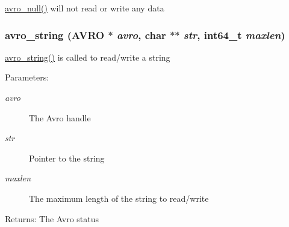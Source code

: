 \hyperlink{group___primitives_gad3a89fbddd4853036ed861dba1ee2c1}{avro\_\-null()} will not read or write any data \hypertarget{group___primitives_g4d568c22cdd854ea5a9c85ed622f7d91}{
\subsubsection[{avro\_\-string}]{ avro\_\-string ({\bf AVRO} $\ast$ {\em avro}, \/  char $\ast$$\ast$ {\em str}, \/  int64\_\-t {\em maxlen})}}
\label{group___primitives_g4d568c22cdd854ea5a9c85ed622f7d91}


\hyperlink{group___primitives_g4d568c22cdd854ea5a9c85ed622f7d91}{avro\_\-string()} is called to read/write a string \begin{Desc}
\item[Parameters:]
\begin{description}
\item[{\em avro}]The Avro handle \item[{\em str}]Pointer to the string \item[{\em maxlen}]The maximum length of the string to read/write \end{description}
\end{Desc}
\begin{Desc}
\item[Returns:]The Avro status \end{Desc}
